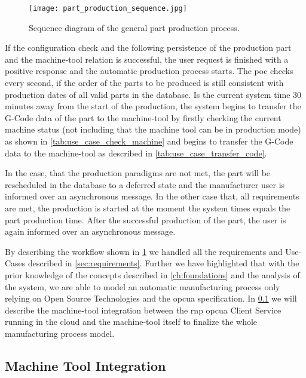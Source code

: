 \documentclass[
a4paper,
twoside,
headsepline,
cleardoublepage=empty,
parskip=half,
draft=false
]{scrbook}
\begin{document}
				\begin{figure}[htbp]
					\centering
					\texttt{[image: part\_production\_sequence.jpg]}
					\caption{Sequence diagram of the general part production process.}
					\label{fig:poc_workflow_diagram}
				\end{figure}

				If the configuration check and the following persistence of the production part and the machine-tool relation is successful, the user request is finished with a positive response and the automatic production process starts.
				The \gls{poc} checks every second, if the order of the parts to be produced is still consistent with production dates of all valid parts in the database. Is the current system time 30 minutes away from the start of the production, the system begins to transfer the G-Code data of the part to the machine-tool by firstly checking the current machine status (not including that the machine tool can be in production mode) as shown in \cref{tab:use_case_check_machine} and begins to transfer the G-Code data to the machine-tool as described in \cref{tab:use_case_transfer_code}.

	\newpage

				In the case, that the production paradigms are not met, the part will be rescheduled in the database to a deferred state and the manufacturer user is informed over an asynchronous message. In the other case that, all requirements are met, the production is started at the moment the system times equals the part production time. After the successful production of the part, the user is again informed over an asynchronous message.

				By describing the workflow shown in \cref{fig:poc_workflow_diagram} we handled all the requirements and Use-Cases described in \cref{sec:requirements}. Further we have highlighted that with the prior knowledge of the concepts described in \cref{ch:foundations} and the analysis of the system, we are able to model an automatic manufacturing process only relying on Open Source Technologies and the \gls{opcua} specification. In \cref{subsec:machine_tool_intergation} we will describe the machine-tool integration between the \gls{rnp} \gls{opcua} Client Service running in the cloud and the machine-tool itself to finalize the whole manufacturing process model.

			\subsection{Machine Tool Integration} \label{subsec:machine_tool_intergation}
\end{document}
